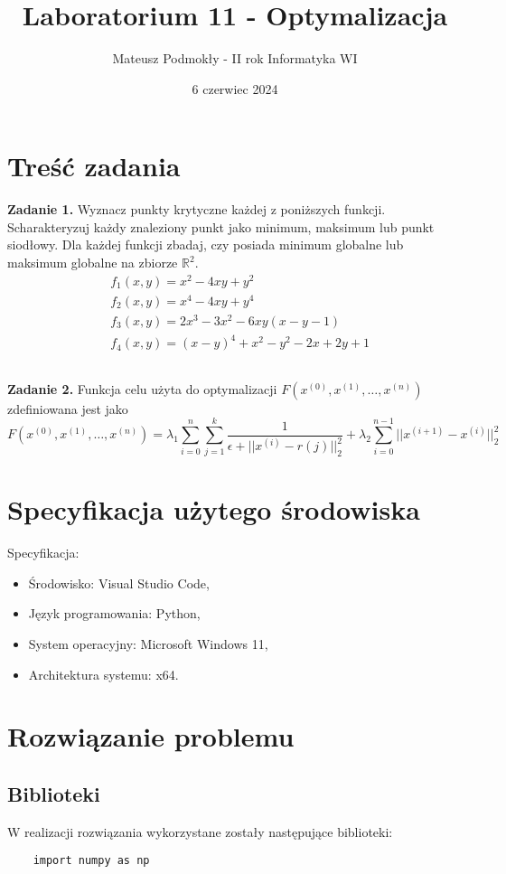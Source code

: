 \documentclass[11pt, leqno]{scrartcl}
\title{Laboratorium 11 - Optymalizacja}
\author{Mateusz Podmokły - II rok Informatyka WI}
\date{6 czerwiec 2024}
\begin{document}
    \maketitle
    \section{Treść zadania}
    \textbf{Zadanie 1.} Wyznacz punkty krytyczne każdej z poniższych
    funkcji. Scharakteryzuj każdy znaleziony punkt jako minimum,
    maksimum lub punkt siodłowy. Dla każdej funkcji zbadaj, czy
    posiada minimum globalne lub maksimum globalne na zbiorze
    $\mathbb{R}^2$.
    \begin{align*}
        &f_1(x,y)=x^2-4xy+y^2 \\
        &f_2(x,y)=x^4-4xy+y^4 \\
        &f_3(x,y)=2x^3-3x^2-6xy(x-y-1) \\
        &f_4(x,y)=(x-y)^4+x^2-y^2-2x+2y+1
    \end{align*}

    \subsection*{}
    \textbf{Zadanie 2.} Funkcja celu użyta do optymalizacji
    $F(x^{(0)},x^{(1)},\dots ,x^{(n)})$ zdefiniowana jest jako
    \[
        F(x^{(0)},x^{(1)},\dots ,x^{(n)})=\lambda _1
            \sum_{i=0}^{n}\sum_{j=1}^{k}\frac{1}
            {\epsilon +||x^{(i)}-r{(j)}||_2^2}+\lambda _2
            \sum_{i=0}^{n-1}||x^{(i+1)}-x^{(i)}||_2^2
    \]

    \section{Specyfikacja użytego środowiska}
    Specyfikacja:
    \begin{itemize}
        \item Środowisko: Visual Studio Code,
        \item Język programowania: Python,
        \item System operacyjny: Microsoft Windows 11,
        \item Architektura systemu: x64.
    \end{itemize}

    \section{Rozwiązanie problemu}
    \subsection{Biblioteki}
    W realizacji rozwiązania wykorzystane zostały następujące
    biblioteki:
    \begin{lstlisting}
    import numpy as np
    \end{lstlisting}
\end{document}
